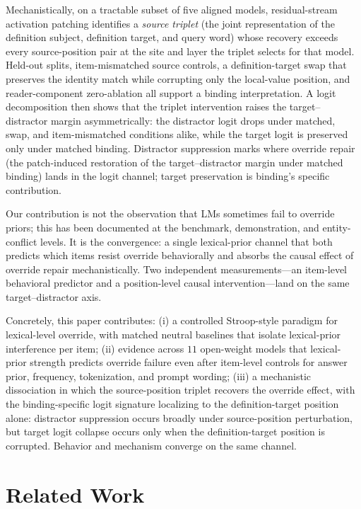\documentclass[11pt]{article}
\begin{document}
Mechanistically, on a tractable subset of five aligned models, residual-stream activation
patching identifies a \emph{source triplet} (the joint representation of the definition
subject, definition target, and query word) whose recovery exceeds every source-position pair
at the site and layer the triplet selects for that model. Held-out splits, item-mismatched
source controls, a definition-target swap that preserves the identity match while corrupting
only the local-value position, and reader-component zero-ablation all support a binding
interpretation. A logit decomposition then shows that the triplet intervention raises the
target--distractor margin asymmetrically: the distractor logit drops under matched, swap, and
item-mismatched conditions alike, while the target logit is preserved only under matched
binding. Distractor suppression marks where override repair (the patch-induced restoration of the
target--distractor margin under matched binding) lands in the logit channel; target
preservation is binding's specific contribution.

Our contribution is not the observation that LMs sometimes fail to override priors; this has
been documented at the benchmark, demonstration, and entity-conflict levels. It is the
convergence: a single lexical-prior channel that both predicts which items resist override
behaviorally and absorbs the causal effect of override repair mechanistically. Two
independent measurements---an item-level behavioral predictor and a position-level causal
intervention---land on the same target--distractor axis.

Concretely, this paper contributes: (i) a controlled Stroop-style paradigm for lexical-level
override, with matched neutral baselines that isolate lexical-prior interference per item;
(ii) evidence across $11$ open-weight models that lexical-prior strength predicts override
failure even after item-level controls for answer prior, frequency, tokenization, and prompt
wording; (iii) a mechanistic dissociation in which the source-position triplet recovers the override
effect, with the binding-specific logit signature localizing to the definition-target position
alone: distractor suppression occurs broadly under source-position perturbation, but target
logit collapse occurs only when the definition-target position is corrupted. Behavior and
mechanism converge on the same channel.


\section{Related Work}
\label{sec:related}
\end{document}
